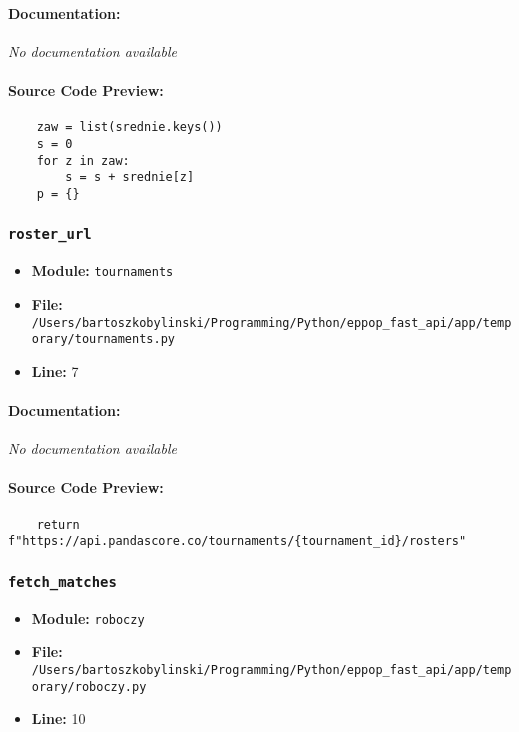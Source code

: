 \documentclass[11pt,a4paper]{article}
\begin{document}
\paragraph{Documentation:} \textit{No documentation available}

\paragraph{Source Code Preview:}
\begin{verbatim}
    zaw = list(srednie.keys())
    s = 0
    for z in zaw:
        s = s + srednie[z]
    p = {}
\end{verbatim}

\vspace{1em}
\subsubsection{\texttt{roster\_url}}

\begin{itemize}
    \item \textbf{Module:} \texttt{tournaments}
    \item \textbf{File:} \texttt{/Users/bartoszkobylinski/Programming/Python/eppop\_fast\_api/app/temporary/tournaments.py}
    \item \textbf{Line:} 7
\end{itemize}

\paragraph{Documentation:} \textit{No documentation available}

\paragraph{Source Code Preview:}
\begin{verbatim}
    return f"https://api.pandascore.co/tournaments/{tournament_id}/rosters"
\end{verbatim}

\vspace{1em}
\subsubsection{\texttt{fetch\_matches}}

\begin{itemize}
    \item \textbf{Module:} \texttt{roboczy}
    \item \textbf{File:} \texttt{/Users/bartoszkobylinski/Programming/Python/eppop\_fast\_api/app/temporary/roboczy.py}
    \item \textbf{Line:} 10
\end{itemize}
\end{document}
